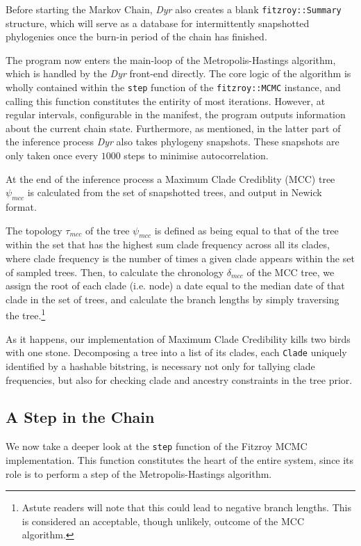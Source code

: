 \documentclass[10pt,journal,compsoc]{IEEEtran}
\begin{document}
Before starting the Markov Chain, \textit{Dyr} also creates a blank \texttt{fitzroy::Summary} structure, which will serve as a database for intermittently snapshotted phylogenies once the burn-in period of the chain has finished. 

The program now enters the main-loop of the Metropolis-Hastings algorithm, which is handled by the  \textit{Dyr} front-end directly. The core logic of the algorithm is wholly contained within the \texttt{step} function of the \texttt{fitzroy::MCMC} instance, and calling this function constitutes the entirity of most iterations. However, at regular intervals, configurable in the manifest, the program outputs information about the current chain state. Furthermore, as mentioned, in the latter part of the inference process \textit{Dyr} also takes phylogeny snapshots. These snapshots are only taken once every $1000$ steps to minimise autocorrelation.

At the end of the inference process a Maximum Clade Crediblity (MCC) tree $\psi_{mcc}$ is calculated from the set of snapshotted trees, and output in Newick format.

The topology $\tau_{mcc}$ of the tree $\psi_{mcc}$ is defined as being equal to that of the tree within the set that has the highest sum clade frequency across all its clades, where clade frequency is the number of times a given clade appears within the set of sampled trees. Then, to calculate the chronology $\delta_{mcc}$ of the MCC tree, we assign the root of each clade (i.e. node) a date equal to the median date of that clade in the set of trees, and calculate the branch lengths by simply traversing the tree.\footnote{Astute readers will note that this could lead to negative branch lengths. This is considered an acceptable, though unlikely, outcome of the MCC algorithm.}

As it happens, our implementation of Maximum Clade Credibility kills two birds with one stone. Decomposing a tree into a list of its clades, each \texttt{Clade} uniquely identified by a hashable bitstring, is necessary not only for tallying clade frequencies, but also for checking clade and ancestry constraints in the tree prior.

\subsection{A Step in the Chain}

We now take a deeper look at the \texttt{step} function of the Fitzroy MCMC implementation. This function constitutes the heart of the entire system, since its role is to perform a step of the Metropolis-Hastings algorithm.
\end{document}
